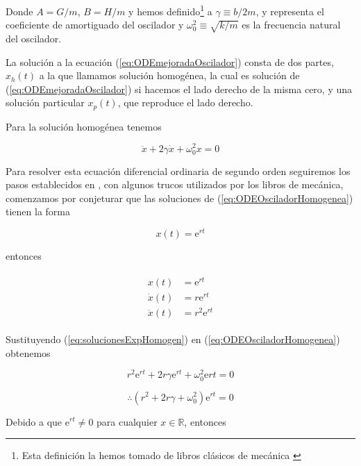 \documentclass[a4paper,10pt]{article}
\newcommand{\euler}{\mathrm{e}}
\begin{document}
Donde $A = G/m$, $B = H/m$ y hemos definido\footnote{Esta definición la hemos tomado de libros clásicos de mecánica \cite{marion,taylor}} 
a  $\gamma \equiv b/2m$, y representa el coeficiente de amortiguado del oscilador 
y $\omega_0^2 \equiv \sqrt{k/m}$ es la frecuencia natural del oscilador. 

\vspace{.3cm}

La solución a la ecuación (\ref{eq:ODEmejoradaOscilador}) consta de dos partes,
$x_h(t)$ a la que llamamos solución homogénea, la cual es solución de (\ref{eq:ODEmejoradaOscilador})
si hacemos el lado derecho de la misma cero, y una solución particular $x_p(t)$, que 
reproduce el lado derecho. 

\vspace{.3cm}

Para la solución homogénea tenemos 

\begin{equation}
 \ddot{x} + 2 \gamma \dot{x} + \omega_0^2 x = 0 
 \label{eq:ODEOsciladorHomogenea}
\end{equation}

Para resolver esta ecuación diferencial ordinaria de segundo orden seguiremos los pasos
establecidos en \cite{zill}, con algunos trucos utilizados por los libros de mecánica,
comenzamos por conjeturar que las soluciones de (\ref{eq:ODEOsciladorHomogenea}) tienen 
la forma 

$$
x(t) = \euler^{rt}
$$

entonces

\begin{align}
 \begin{split}
  x(t) &= \euler^{rt} \\
  \dot{x}(t) &= r\euler^{rt} \\
  \ddot{x}(t) &= r^2\euler^{rt} 
  \label{eq:solucionesExpHomogen}
 \end{split}
\end{align}

Sustituyendo (\ref{eq:solucionesExpHomogen}) en (\ref{eq:ODEOsciladorHomogenea}) obtenemos

\begin{equation}
 r^2 \euler^{rt} + 2r\gamma \euler^{rt} + \omega_0^2 \euler{rt} = 0
 \label{eq:CasiCaracteristica}
\end{equation}

$$
\therefore \left(r^2 + 2r\gamma + \omega_0^2\right) \euler^{rt} = 0
$$

Debido a que $\euler^{rt} \neq 0$ para cualquier $x \in \mathbb{R}$, entonces
\end{document}
